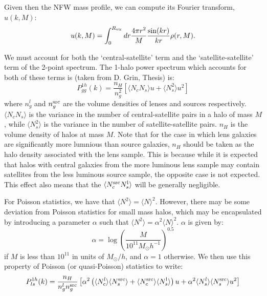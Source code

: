 \documentclass[onecolumn,amsmath,aps,fleqn, superscriptaddress]{revtex4}
\begin{document}
Given then the NFW mass profile, we can compute its Fourier transform, $u(k, M)$:
\begin{equation}
u(k, M) = \int_0^{R_{\rm vir}} dr \frac{4 \pi r^2}{M}\frac{\sin(kr)}{kr}\rho(r, M).
\label{u}
\end{equation}

We must account for both the `central-satellite' term and the `satellite-satellite' term of the 2-point spectrum. The 1-halo power spectrum which accounts for both of these terms is (taken from D. Grin, Thesis) is:
\begin{equation}
P_{gg}^{1h}(k) = \frac{n_H}{n_g^2}\left[\langle N_c N_s \rangle u + \langle N_s^2 \rangle u^2\right]
\label{1hpgg}
\end{equation}
where $n_g^l$ and $n_g^{\rm src}$ are the volume densities of lenses and sources respectively. $\langle N_c N_s \rangle$ is the variance in the number of central-satellite pairs in a halo of mass $M$, while $\langle N_s^2 \rangle$ is the variance in the number of satellite-satellite pairs. $n_H$ is the volume density of halos at mass $M$. Note that for the case in which lens galaxies are significantly more lumnious than source galaxies, $n_H$ should be taken as the halo density associated with the lens sample. This is because while it is expected that halos with central galaxies from the more luminous lens sample may contain satellites from the less luminous source sample, the opposite case is not expected. This effect also means that the $\langle N_c^{\rm src} N_s^{\rm l} \rangle$ will be generally negligible.

For Poisson statistics, we have that $\langle N^2 \rangle = \langle N \rangle^2$. However, there may be some deviation from Poisson statistics for small mass halos, which may be encapsulated by introducing a parameter $\alpha$ such that $\langle N^2 \rangle = \alpha^2\langle N \rangle^2$. $\alpha$ is given by:
\begin{equation}
\alpha = \log\left(\frac{M}{10^{11}M_\odot h^{-1}}\right)^{0.5}
\label{alpha}
\end{equation}
if $M$ is less than $10^{11}$ in units of $M_\odot / h$, and $\alpha=1$ otherwise. We then use this property of Poisson (or quasi-Poisson) statistics to write:
\begin{equation}
P_{ls}^{1h}(k) = \frac{n_H}{n_g^l n_g^{\rm src}}\left[\alpha^2 \left(\langle N_c^l \rangle \langle N_s^{\rm src} \rangle + \langle N_c^{\rm src}\rangle \langle N_s^{\rm l} \rangle\right) u + \alpha^2\langle N_s^l \rangle \langle N_s^{\rm src} \rangle u^2\right]
\label{1hpgg_Pois}
\end{equation}
\end{document}
